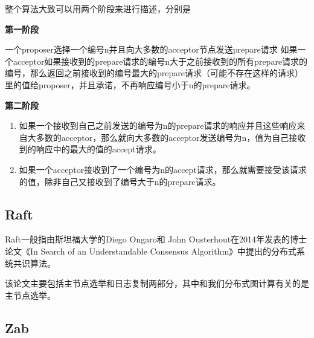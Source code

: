 \documentclass{article}
\begin{document}
整个算法大致可以用两个阶段来进行描述，分别是

	\textbf{第一阶段}

	一个proposer选择一个编号n并且向大多数的acceptor节点发送prepare请求
	如果一个acceptor如果接收到的prepare请求的编号n大于之前接收到的所有prepare请求的编号，那么返回之前接收到的编号最大的prepare请求（可能不存在这样的请求）里的值给proposer，并且承诺，不再响应编号小于n的prepare请求。

	\textbf{第二阶段}
        \begin{enumerate}
	\item 如果一个接收到自己之前发送的编号为n的prepare请求的响应并且这些响应来自大多数的acceptor，那么就向大多数的acceptor发送编号为n，值为自己接收到的响应中的最大的值的accept请求。
        \item 如果一个acceptor接收到了一个编号为n的accept请求，那么就需要接受该请求的值，除非自己又接收到了编号大于n的prepare请求。
        \end{enumerate}
\subsection{Raft}

Raft一般指由斯坦福大学的Diego Ongaro和 John Ousterhout在2014年发表的博士论文《In Search of an Understandable Consensus Algorithm》中提出的分布式系统共识算法。

该论文主要包括主节点选举和日志复制两部分，其中和我们分布式图计算有关的是主节点选举。

\subsection{Zab}





\end{document}

